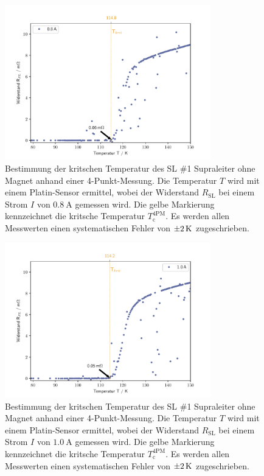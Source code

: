 \begin{figure}[H]
    \centering
    \includegraphics[width=0.8\textwidth]{Auswertung/I_krit_Pt/R_T_0.8A.pdf}
    \caption{Bestimmung der kritschen Temperatur des SL \#1 Supraleiter ohne Magnet
    anhand einer 4-Punkt-Messung. Die Temperatur $T$ wird mit einem Platin-Sensor
    ermittel, wobei der Widerstand $R_{\text{SL}}$ bei einem Strom $I$ von
    $\SI{0.8}{\ampere}$ gemessen wird.
		Die gelbe Markierung kennzeichnet die kritsche Temperatur	$T^{\text{4PM}}_{\text{c}}$.
		Es werden allen Messwerten einen systematischen Fehler von $\SI{\pm2}{\kelvin}$
		zugeschrieben.}
    \label{fig:Tc1.4}
\end{figure}

\begin{figure}[H]
    \centering
    \includegraphics[width=0.8\textwidth]{Auswertung/I_krit_Pt/R_T_1.0A.pdf}
    \caption{Bestimmung der kritschen Temperatur des SL \#1 Supraleiter ohne Magnet
    anhand einer 4-Punkt-Messung. Die Temperatur $T$ wird mit einem Platin-Sensor
    ermittel, wobei der Widerstand $R_{\text{SL}}$ bei einem Strom $I$ von
    $\SI{1.0}{\ampere}$ gemessen wird.
		Die gelbe Markierung kennzeichnet die kritsche Temperatur	$T^{\text{4PM}}_{\text{c}}$.
		Es werden allen Messwerten einen systematischen Fehler von $\SI{\pm2}{\kelvin}$
		zugeschrieben.}
    \label{fig:Tc1.5}
\end{figure}

